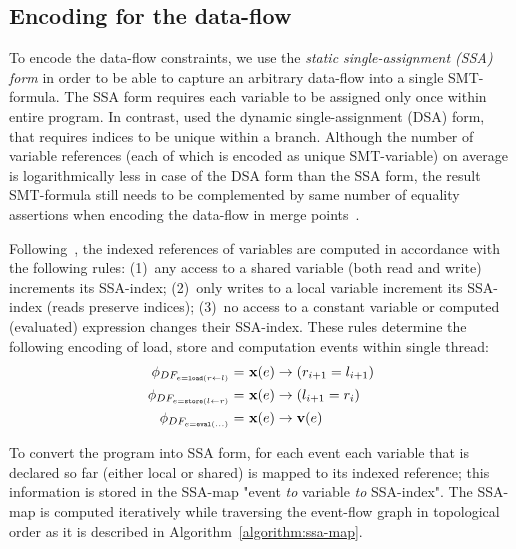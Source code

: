 \subsection{Encoding for the data-flow}
\label{ch:port:enc:df}

To encode the data-flow constraints, we use the \textit{static single-assignment (SSA) form} in order to be able to capture an arbitrary data-flow into a single SMT-formula.
The SSA form requires each variable to be assigned only once within entire program.
In contrast, \porthos{} used the dynamic single-assignment (DSA) form, that requires indices to be unique within a branch.
Although the number of variable references (each of which is encoded as unique SMT-variable) on average is logarithmically less in case of the DSA form than the SSA form, the result SMT-formula still needs to be complemented by same number of equality assertions when encoding the data-flow in merge points~\cite{Porthos17a}.

Following~\cite{Porthos17b}, the indexed references of variables are computed in accordance with the following rules:
(1)~any access to a shared variable (both read and write) increments its SSA-index;
(2)~only writes to a local variable increment its SSA-index (reads preserve indices);
(3)~no access to a constant variable or computed (evaluated) expression changes their SSA-index.
These rules determine the following encoding of load, store and computation events within single thread:
\begin{align}
    \phi_{DF_{e = \mathtt{load}(r \leftarrow l)}} = \ & \fx(e) \rightarrow (r_{i+1} = l_{i+1}) \\
    \phi_{DF_{e = \mathtt{store}(l \leftarrow r)}} = \ & \fx(e) \rightarrow (l_{i+1} = r_i) \\
    \phi_{DF_{e = \mathtt{eval}(...)}} = \ & \fx(e) \rightarrow \fv(e) %
\end{align}

To convert the program into SSA form, for each event each variable that is declared so far (either local or shared) is mapped to its indexed reference; this information is stored in the SSA-map "event \textit{to} variable \textit{to} SSA-index". %
The SSA-map is computed iteratively while traversing the event-flow graph in topological order as it is described in Algorithm~\ref{algorithm:ssa-map}.

